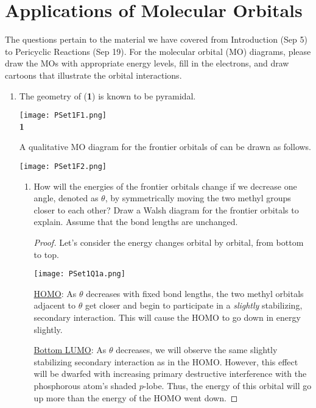 \documentclass[../psets.tex]{subfiles}
\begin{document}
\section{Applications of Molecular Orbitals}
The questions pertain to the material we have covered from Introduction (Sep 5) to Pericyclic Reactions (Sep 19). For the molecular orbital (MO) diagrams, please draw the MOs with appropriate energy levels, fill in the electrons, and draw cartoons that illustrate the orbital
interactions.
\begin{enumerate}
    \item The geometry of  (\textbf{1}) is known to be pyramidal.
    \begin{center}
        \texttt{[image: PSet1F1.png]}\\
        \textbf{1}
    \end{center}
    A qualitative MO diagram for the frontier orbitals of  can be drawn as follows.
    \begin{center}
        \texttt{[image: PSet1F2.png]}
    \end{center}
    \begin{enumerate}
        \item How will the energies of the frontier orbitals change if we decrease one  angle, denoted as $\theta$, by symmetrically moving the two methyl groups closer to each other? Draw a Walsh diagram for the frontier orbitals to explain. Assume that the bond lengths are unchanged.
        \begin{proof}
            Let's consider the energy changes orbital by orbital, from bottom to top.\par
            \begin{center}
                \texttt{[image: PSet1Q1a.png]}
            \end{center}
            \underline{HOMO}: As $\theta$ decreases with fixed bond lengths, the two methyl orbitals adjacent to $\theta$ get closer and begin to participate in a \emph{slightly} stabilizing, secondary interaction. This will cause the HOMO to go down in energy slightly.\par
            \underline{Bottom LUMO}: As $\theta$ decreases, we will observe the same slightly stabilizing secondary interaction as in the HOMO. However, this effect will be dwarfed with increasing primary destructive interference with the phosphorous atom's shaded $p$-lobe. Thus, the energy of this orbital will go up more than the energy of the HOMO went down.\par

\end{proof}
\end{enumerate}
\end{enumerate}
\end{document}
